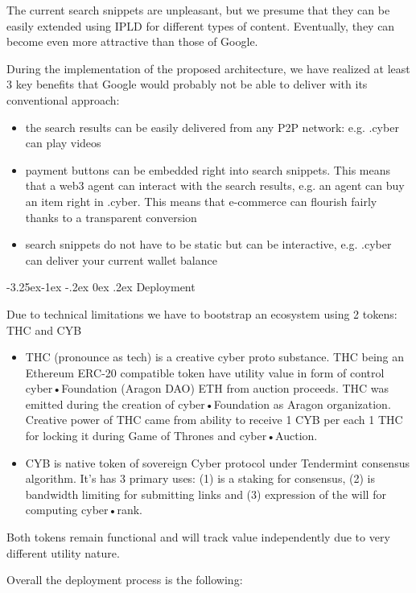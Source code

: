 \documentclass[8pt,oneside]{amsart}
\makeatletter
\renewcommand\subsection{\@startsection{subsection}{2}{\z@}%
                                     {-3.25ex\@plus -1ex \@minus -.2ex}%
                                     {0ex \@plus .2ex}%
                                     {\play\Large}}%
\newcommand{\titleSection}[1]{\subsection{#1}}
\newcommand{\code}[1]{{\PlayBold #1}}
\makeatother
\begin{document}
\begin{Abstract}
The current search snippets are unpleasant, but we presume that they can be easily extended using IPLD for different types of content. Eventually, they can become even more attractive than those of Google.

During the implementation of the proposed architecture, we have realized at least 3 key benefits that Google would probably not be able to deliver with its conventional approach:

\begin{itemize}
\item the search results can be easily delivered from any P2P network: e.g. .cyber can play videos
\item payment buttons can be embedded right into search snippets. This means that a web3 agent can interact with the search results, e.g. an agent can buy an item right in \code{.cyber}. This means that e-commerce can flourish fairly thanks to a transparent conversion
\item search snippets do not have to be static but can be interactive, e.g. \code{.cyber} can deliver your current wallet balance
\end{itemize}

\titleSection{Deployment}\label{deployment}

Due to technical limitations we have to bootstrap an ecosystem using 2 tokens: THC and CYB

\begin{itemize}
\item THC (pronounce as tech) is a creative cyber proto substance. THC being an Ethereum ERC-20 compatible token have utility value in form of control cyber•Foundation (Aragon DAO) ETH from auction proceeds. THC was emitted during the creation of cyber•Foundation as Aragon organization. Creative power of THC came from ability to receive 1 CYB per each 1 THC for locking it during Game of Thrones and cyber•Auction.
\item CYB is native token of sovereign Cyber protocol under Tendermint consensus algorithm. It's has 3 primary uses: (1) is a staking for consensus, (2) is bandwidth limiting for submitting links and (3) expression of the will for computing cyber•rank.
\end{itemize}

Both tokens remain functional and will track value independently due to very different utility nature.

Overall the deployment process is the following:


\end{Abstract}
\end{document}
